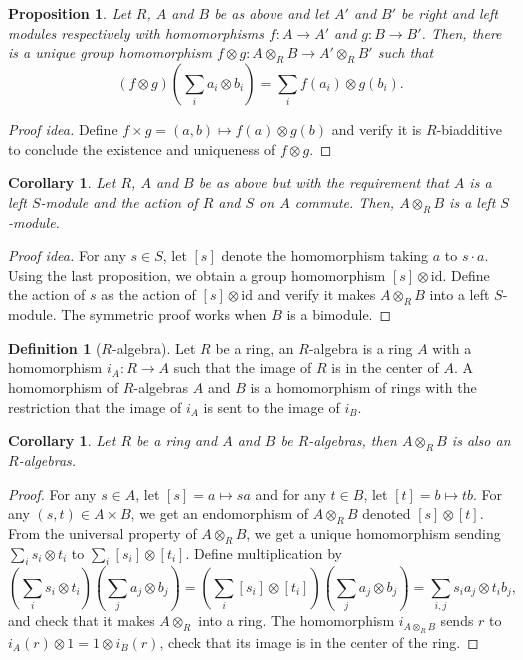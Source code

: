 \documentclass[paper=a4, fontsize=12pt]{scrartcl} %
\newtheorem{cor}[thm]{Corollary}
\newtheorem{prop}[thm]{Proposition}
\theoremstyle{definition}
\newtheorem{defn}[thm]{Definition}
\theoremstyle{remark}
\newcommand{\bra}[1]{\left(#1\right)}
\begin{document}
\begin{prop}
	Let $R$, $A$ and $B$ be as above and let $A'$ and $B'$ be right and left modules respectively with homomorphisms $f:A \rightarrow A'$ and $g: B\rightarrow B'$. Then, there is a unique group homomorphism $f\otimes g : A\otimes_R B \rightarrow A'\otimes_R B'$ such that
	$$(f\otimes g)\bra{\sum_i a_i \otimes b_i} = \sum_i f(a_i)\otimes g(b_i).$$
\end{prop}
\begin{proof}[Proof idea]
	Define $f\times g = (a,b) \mapsto f(a)\otimes g(b)$ and verify it is $R$-biadditive to conclude the existence and uniqueness of $f \otimes g$.
\end{proof}
\begin{cor}
	Let $R$, $A$ and $B$ be as above but with the requirement that $A$ is a left $S$-module and the action of $R$ and $S$ on $A$ commute. Then, $A \otimes_R B$ is a left $S$-module.
\end{cor}
\begin{proof}[Proof idea]
	For any $s \in S$, let $[s]$ denote the homomorphism taking $a$ to $s\cdot a$. Using the last proposition, we obtain a group homomorphism $[s] \otimes \text{id}$. Define the action of $s$ as the action of $[s] \otimes \text{id}$ and verify it makes $A\otimes_R B$ into a left $S$-module. The symmetric proof works when $B$ is a bimodule.
\end{proof}
\begin{defn}[$R$-algebra]
	Let $R$ be a ring, an $R$-algebra is a ring $A$ with a homomorphism $i_A:R \rightarrow A$ such that the image of $R$ is in the center of $A$. A homomorphism of $R$-algebras $A$ and $B$ is a homomorphism of rings with the restriction that the image of $i_A$ is sent to the image of $i_B$.
\end{defn}
\begin{cor}
	Let $R$ be a ring and $A$ and $B$ be $R$-algebras, then $A\otimes_R B$ is also an $R$-algebras.
\end{cor}
\begin{proof}
	For any $s \in A$, let $[s] = a\mapsto sa$ and for any $t \in B$, let $[t] = b \mapsto tb$. For any $(s,t) \in A\times B$, we get an endomorphism of $A\otimes_R B$ denoted $[s]\otimes [t]$. From the universal property of $A\otimes_R B$, we get a unique homomorphism sending $\sum_i s_i \otimes t_i$ to $\sum_i [s_i]\otimes [t_i]$. Define multiplication by 
	$$\bra{\sum_i s_i \otimes t_i}\bra{\sum_j a_j \otimes b_j} = \bra{\sum_i[s_i] \otimes [t_i]}\bra{\sum_j a_j \otimes b_j} = \sum_{i,j} s_ia_j \otimes t_i b_j,$$
	and check that it makes $A\otimes_R$ into a ring. The homomorphism $i_{A\otimes_R B}$ sends $r$ to $i_A(r) \otimes 1 = 1 \otimes i_B(r)$, check that its image is in the center of the ring.
\end{proof}
\end{document}
